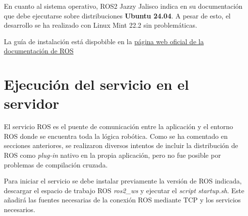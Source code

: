 En cuanto al sistema operativo, ROS2 Jazzy Jalisco indica en su documentación que debe ejecutarse sobre distribuciones 
\textbf{Ubuntu 24.04}. A pesar de esto, el desarrollo se ha realizado con Linux Mint 22.2 sin problemáticas.

La guía de instalación está dispobible en la 
\href{https://docs.ros.org/en/jazzy/Installation/Ubuntu-Install-Debs.html}{página web oficial de la documentación de ROS}

\section{Ejecución del servicio en el servidor}
El servicio ROS es el puente de comunicación entre la aplicación y el entorno ROS donde se encuentra toda la lógica robótica.
Como se ha comentado en secciones anteriores, se realizaron diversos intentos de incluir la distribución de ROS como 
\textit{plug-in} nativo en la propia aplicación, pero no fue posible por problemas de compilación cruzada.

Para iniciar el servicio se debe instalar previamente la versión de ROS indicada, descargar el 
espacio de trabajo ROS \textit{ros2\_ws} y ejecutar el \textit{script startup.sh}.
Este añadirá las fuentes necesarias de la conexión ROS mediante TCP y los servicios necesarios.
